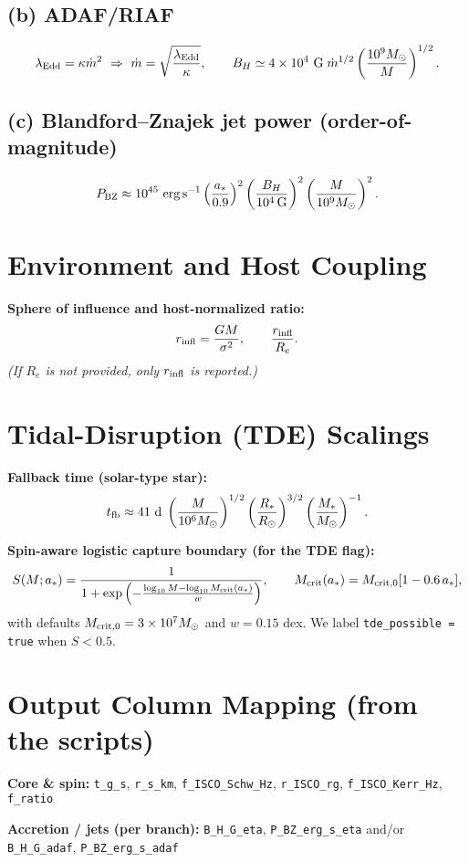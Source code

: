 \documentclass[12pt]{article}
\begin{document}
\subsection*{(b) ADAF/RIAF}
\[
\lambda_{\rm Edd} = \kappa \dot m^2 \ \Rightarrow\
\dot m = \sqrt{\frac{\lambda_{\rm Edd}}{\kappa}},\qquad
B_H \simeq 4\times10^{4}\ {\rm G}\;\dot m^{1/2}\left(\frac{10^9 M_\odot}{M}\right)^{1/2}.
\]

\subsection*{(c) Blandford–Znajek jet power (order-of-magnitude)}
\[
P_{\rm BZ} \approx 10^{45}\ {\rm erg\,s^{-1}}
\left(\frac{a_*}{0.9}\right)^{2}
\left(\frac{B_H}{10^{4}\,{\rm G}}\right)^{2}
\left(\frac{M}{10^{9}M_\odot}\right)^{2}.
\]

\section{Environment and Host Coupling}
\textbf{Sphere of influence and host-normalized ratio:}
\[
r_{\rm infl} = \frac{GM}{\sigma^2},\qquad
\frac{r_{\rm infl}}{R_e}.
\]
\textit{(If $R_e$ is not provided, only $r_{\rm infl}$ is reported.)}

\section{Tidal-Disruption (TDE) Scalings}
\textbf{Fallback time (solar-type star):}
\[
t_{\rm fb} \approx 41~{\rm d}\;
\left(\frac{M}{10^{6}M_\odot}\right)^{1/2}
\left(\frac{R_*}{R_\odot}\right)^{3/2}
\left(\frac{M_*}{M_\odot}\right)^{-1}.
\]

\textbf{Spin-aware logistic capture boundary (for the TDE flag):}
\[
S(M;a_*) = \frac{1}{1+\exp\left(-\frac{\log_{10}M-\log_{10}M_{\rm crit}(a_*)}{w}\right)},\qquad
M_{\rm crit}(a_*) = M_{\rm crit,0}[1-0.6\,a_*],
\]
with defaults $M_{\rm crit,0} = 3\times10^{7}M_\odot$ and $w = 0.15$ dex.  
We label \texttt{tde\_possible = true} when $S < 0.5$.

\section{Output Column Mapping (from the scripts)}
\textbf{Core \& spin:}  
\texttt{t\_g\_s}, \texttt{r\_s\_km}, \texttt{f\_ISCO\_Schw\_Hz}, \texttt{r\_ISCO\_rg}, \texttt{f\_ISCO\_Kerr\_Hz}, \texttt{f\_ratio}

\textbf{Accretion / jets (per branch):}  
\texttt{B\_H\_G\_eta}, \texttt{P\_BZ\_erg\_s\_eta} and/or \texttt{B\_H\_G\_adaf}, \texttt{P\_BZ\_erg\_s\_adaf}
\end{document}
